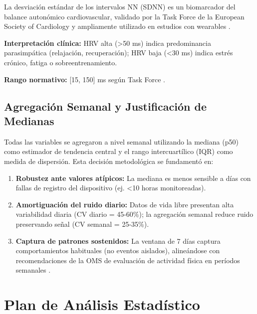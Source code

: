 La desviación estándar de los intervalos NN (SDNN) es un biomarcador del balance autonómico cardiovascular, validado por la Task Force de la European Society of Cardiology \cite{TaskForce1996} y ampliamente utilizado en estudios con wearables \cite{Laborde2017}.

\textbf{Interpretación clínica:} HRV alta (>50 ms) indica predominancia parasimpática (relajación, recuperación); HRV baja (<30 ms) indica estrés crónico, fatiga o sobreentrenamiento.

\textbf{Rango normativo:} [15, 150] ms según Task Force \cite{TaskForce1996}.

\subsection{Agregación Semanal y Justificación de Medianas}
\label{subsec:agregacion_semanal}

Todas las variables se agregaron a nivel semanal utilizando la mediana (p50) como estimador de tendencia central y el rango intercuartílico (IQR) como medida de dispersión. Esta decisión metodológica se fundamentó en:

\begin{enumerate}
    \item \textbf{Robustez ante valores atípicos:} La mediana es menos sensible a días con fallas de registro del dispositivo (ej. <10 horas monitoreadas).
    
    \item \textbf{Amortiguación del ruido diario:} Datos de vida libre presentan alta variabilidad diaria (CV diario = 45-60\%); la agregación semanal reduce ruido preservando señal (CV semanal = 25-35\%).
    
    \item \textbf{Captura de patrones sostenidos:} La ventana de 7 días captura comportamientos habituales (no eventos aislados), alineándose con recomendaciones de la OMS de evaluación de actividad física en períodos semanales \cite{WHO2020}.
\end{enumerate}

\section{Plan de Análisis Estadístico}
\label{sec:plan_analisis_estadistico}

